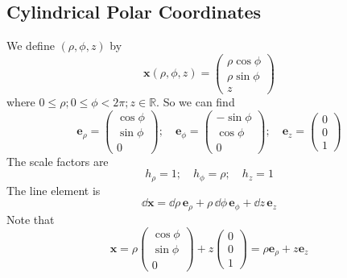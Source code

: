 \documentclass{article}
\begin{document}
\subsection{Cylindrical Polar Coordinates}
We define $(\rho, \phi, z)$ by
\[ \bm x(\rho, \phi, z) = \begin{pmatrix}
        \rho \cos \phi \\
        \rho \sin \phi \\
        z
    \end{pmatrix} \]
where $0 \leq \rho; 0 \leq \phi < 2 \pi; z \in \mathbb R$. So we can find
\[ \bm e_\rho = \begin{pmatrix}
        \cos \phi \\ \sin \phi \\ 0
    \end{pmatrix};\quad \bm e_\phi = \begin{pmatrix}
        -\sin \phi \\ \cos \phi \\ 0
    \end{pmatrix};\quad \bm e_z = \begin{pmatrix}
        0 \\ 0 \\ 1
    \end{pmatrix} \]
The scale factors are
\[ h_\rho = 1;\quad h_\phi = \rho;\quad h_z = 1 \]
The line element is
\[ \dd \bm x = \dd \rho \, \bm e_\rho + \rho \, \dd \phi \, \bm e_\phi + \dd z \, \bm e_z \]
Note that
\[ \bm x = \rho \begin{pmatrix}
        \cos \phi \\ \sin \phi \\ 0
    \end{pmatrix} + z \begin{pmatrix}
        0 \\ 0 \\ 1
    \end{pmatrix} = \rho \bm e_\rho + z \bm e_z \]
\end{document}
